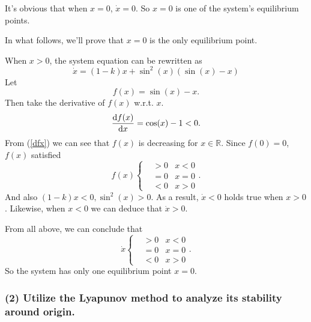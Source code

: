 \documentclass[12pt,a4paper]{article}
\begin{document}
\indent It's obvious that when $x=0$, $\dot{x}=0$. So $x=0$ is one of the system's equilibrium points.

\indent In what follows, we'll prove that $x=0$ is the only equilibrium point.

\indent When $x>0$, the system equation can be rewritten as
\begin{equation}
\dot{x}=(1-k)x+\sin^2(x)(\sin(x)-x)
\end{equation}
Let
\begin{equation}
f(x)=\sin(x)-x.
\end{equation}
Then take the derivative of $f(x)$ w.r.t. $x$.
\begin{equation}
\frac{{\rm d}f(x)}{{\rm d}x}=\cos(x)-1<0.
\label{dfx}
\end{equation}
From (\ref{dfx}) we can see that $f(x)$ is decreasing for $x\in {\mathbb R}$. Since $f(0)=0$, $f(x)$ satisfied
\begin{equation}
f(x)
\left\{
    \begin{aligned}
    &>0 &x<0\\
    &=0 &x=0\\
    &<0 &x>0
    \end{aligned}
\right. .
\label{fx}
\end{equation}
And also $(1-k)x<0, \sin^2(x)>0$. As a result, $\dot{x}<0$ holds true when $x>0$. Likewise, when $x<0$ we can deduce that $\dot{x}>0$.

\indent From all above, we can conclude that
\begin{equation}
\dot{x}
\left\{
    \begin{aligned}
    &>0 &x<0\\
    &=0 &x=0\\
    &<0 &x>0
    \end{aligned}
\right. .
\label{xdot}
\end{equation}
So the system has only one equilibrium point $x=0$.

\subsubsection*{(2) Utilize the Lyapunov method to analyze its stability around origin.}
\end{document}
